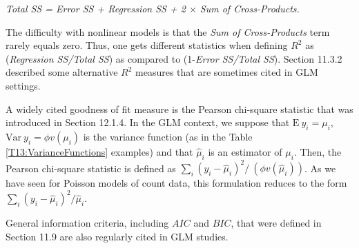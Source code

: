 \begin{center} \textit{Total SS = Error SS + Regression SS + 2
$\times$ Sum of Cross-Products.} \end{center}


\noindent The difficulty with nonlinear models is that the
\textit{Sum of Cross-Products} term rarely equals zero. Thus, one
gets different statistics when defining $R^2$ as (\textit{Regression
SS/Total SS}) as compared to (1-\textit{Error SS/Total SS}). Section
11.3.2 described some alternative $R^2$ measures that are sometimes
cited in GLM settings.

A widely cited goodness of fit measure is the Pearson chi-square
statistic that was introduced in Section 12.1.4. In the GLM context,
we suppose that $\mathrm{E~}y_i = \mu_i$, $\mathrm{Var~}y_i = \phi
v(\mu_i)$ is the variance function (as in the Table
\ref{T13:VarianceFunctions} examples) and that $\widehat{\mu}_i$ is
an estimator of $\mu_i$. Then, the Pearson chi-square statistic is
defined as $\sum_i \left( y_i - \widehat{\mu}_i \right)^2/\ ( \phi
v(\widehat{\mu}_i))$. As we have seen for Poisson models of count
data, this formulation reduces to the form $\sum_i \left( y_i -
\widehat{\mu}_i \right)^2/\widehat{\mu}_i.$

General information criteria, including $AIC$ and $BIC$, that were
defined in Section 11.9 are also regularly cited in GLM studies.


